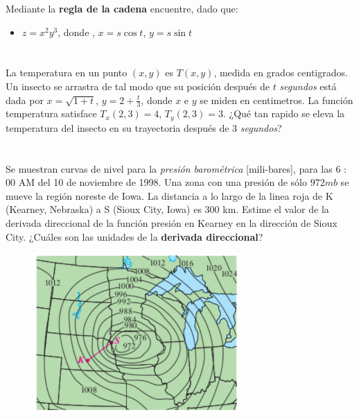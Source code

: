 \documentclass[12pt]{article}
\begin{document}
Mediante la \textbf{regla de la cadena} encuentre, dado que:

\begin{itemize}[format=\textbf]

\item $z=x^2y^3$, donde , $x=s \cos{t}$, $y=s \sin{t}$

\end{itemize}

\section{}

La temperatura en un punto $(x, y)$ es $T(x, y)$, medida en grados centigrados. Un insecto se arrastra de tal modo que su posición después de $t$ \textit{segundos} está dada por $x =
\sqrt{1 + t}$, $y = 2 + \frac{t}{3}$, donde $x$ e $y$ se miden en centimetros. La función temperatura satisface $T_x(2, 3) = 4$, $T_y(2, 3) = 3$.
¿Qué tan rapido se eleva la temperatura del insecto en su trayectoria después de 3 \textit{segundos}?

\section{}

Se muestran curvas de nivel para la \textit{presión barométrica} [mili-bares], para las 6 : 00 AM del 10 de noviembre de 1998. Una zona con una presión de
sólo $972 mb$ se mueve la región noreste de Iowa. La distancia a lo largo de la linea roja de K (Kearney, Nebraska) a S (Sioux City, Iowa) es 300 km. Estime el valor de la derivada direccional de la función presión en Kearney en la dirección de Sioux City. ¿Cuáles son las unidades de la \textbf{derivada
  direccional}?

\begin{figure}[H]
  \centering
  \includegraphics[width=0.7\textwidth]{./img/t3_ej12.png}
\end{figure}
\end{document}
